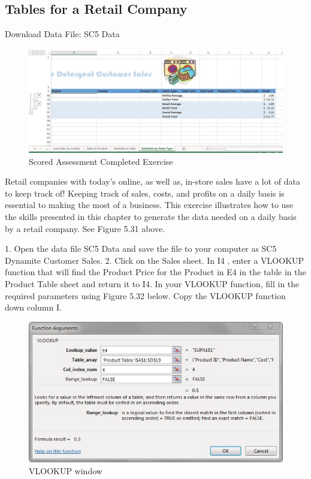 \subsection{Tables for a Retail Company}

Download Data File: SC5 Data


\begin{figure}[H]
	\centering
	\includegraphics[width=\maxwidth{.95\linewidth}]{gfx/ch05_fig31}
	\caption{Scored Assessment Completed Exercise}
	\label{05:fig31}
\end{figure}



Retail companies with today’s online, as well as, in-store sales have a lot of data to keep track of!
Keeping track of sales, costs, and profits on a daily basis is essential to making the most of a business.
This exercise illustrates how to use the skills presented in this chapter to generate the data needed on
a daily basis by a retail company. See Figure 5.31 above.

1. Open the data file SC5 Data and save the file to your computer as SC5 Dynamite Customer
Sales.
2. Click on the Sales sheet. In I4 , enter a VLOOKUP function that will find the Product Price for
the Product in E4 in the table in the Product Table sheet and return it to I4. In your VLOOKUP
function, fill in the required parameters using Figure 5.32 below. Copy the VLOOKUP function
down column I.


\begin{figure}[H]
	\centering
	\includegraphics[width=\maxwidth{.95\linewidth}]{gfx/ch05_fig32}
	\caption{VLOOKUP window}
	\label{05:fig32}
\end{figure}






